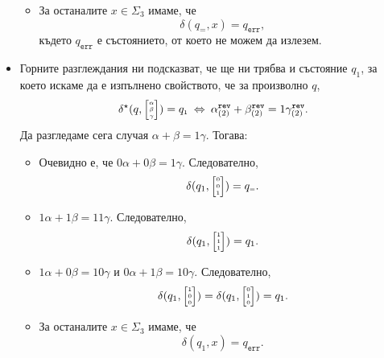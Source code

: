 \begin{hint}
\begin{itemize}
\begin{itemize}
    \item
      За останалите $x \in \Sigma_3$ имаме, че
      \[\delta(q_{\scriptscriptstyle{=}},x) = q_{\texttt{err}},\]
      където $q_{\texttt{err}}$ е състоянието, от което не можем да излезем.
    \end{itemize}
  \item
    Горните разглеждания ни подсказват, че ще ни трябва и състояние $q_1$, за което искаме да е изпълнено свойството,
    че за произволно $q$,
    \[\delta^\star(q, \tiny{ \begin{bmatrix} \alpha\\ \beta \\ \gamma\end{bmatrix} }) = q_{\scriptscriptstyle{1}}  \iff \alpha^{\texttt{rev}}_{(2)} + \beta^{\texttt{rev}}_{(2)} = 1\gamma^{\texttt{rev}}_{(2)}.\]
    Да разгледаме сега случая $\alpha + \beta = 1\gamma$. Тогава:
    \begin{itemize}
    \item 
      Очевидно е, че $0\alpha + 0\beta = 1\gamma$. Следователно,
      \[\delta(q_1,\tiny{ \begin{bmatrix} 0\\ 0 \\ 1\end{bmatrix} }) = q_{\scriptscriptstyle{=}}.\]
    \item
      $1\alpha + 1\beta = 11\gamma$. Следователно,
      \[\delta(q_1,\tiny{ \begin{bmatrix} 1\\ 1 \\ 1\end{bmatrix} }) = q_{1}.\]
    \item
      $1\alpha + 0\beta = 10\gamma$ и $0\alpha + 1\beta = 10\gamma$. Следователно,
      \[\delta(q_1,\tiny{ \begin{bmatrix} 1\\ 0 \\ 0\end{bmatrix} }) = \delta(q_1,\tiny{ \begin{bmatrix} 0\\ 1 \\ 0\end{bmatrix} }) = q_{1}.\]
    \item
      За останалите $x \in \Sigma_3$ имаме, че
      \[\delta(q_{1},x) = q_{\texttt{err}}.\]
    \end{itemize}    
  \end{itemize}
\end{hint}
\fi

